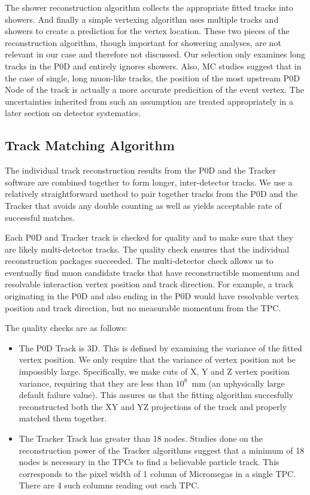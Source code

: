 The shower reconstruction algorithm collects the appropriate fitted tracks into showers. And finally a simple vertexing algorithm uses multiple tracks and showers to create a prediction for the vertex location. These two pieces of the reconstruction algorithm, though important for showering analyses, are not relevant in our case and therefore not discussed. Our selection only examines long tracks in the P0D and entirely ignores showers. Also, MC studies suggest that in the case of single, long muon-like tracks, the position of the most upstream P0D Node of the track is actually a more accurate predicition of the event vertex. The uncertainties inherited from such an assumption are treated appropriately in a later section on detector systematics.

\subsection{Track Matching Algorithm}
\label{sec:matching}

 The individual track reconstruction results from the P0D and the Tracker software are combined together to form longer, inter-detector tracks. We use a relatively straightforward method to pair together tracks from the P0D and the Tracker that avoids any double counting as well as yields acceptable rate of successful matches. 

Each P0D and Tracker track is checked for quality and to make sure that they are likely multi-detector tracks. The quality check ensures that the individual reconstruction packages succeeded. The multi-detector check allows us to eventually find muon candidate tracks that have reconstructible momentum and resolvable interaction vertex position and track direction. For example, a track originating in the P0D and also ending in the P0D would have resolvable vertex position and track direction, but no measurable momentum from the TPC. 

The quality checks are as follows:
\begin{itemize}
\item The P0D Track is 3D. This is defined by examining the variance of the fitted vertex position. We only require that the variance of vertex position not be impossibly large. Specifically, we make cuts of X, Y and Z vertex position variance, requiring that they are less than $10^8$~mm (an uphysically large default failure value). This assures us that the fitting algorithm succesfully reconstructed both the XY and YZ projections of the track and properly matched them together.
\item The Tracker Track has greater than 18 nodes. Studies done on the reconstruction power of the Tracker algorithms suggest that a minimum of 18 nodes is necessary in the TPCs to find a believable particle track. This corresponds to the pixel width of 1 column of Micromegas in a single TPC. There are 4 such columns reading out each TPC.
\end{itemize}

